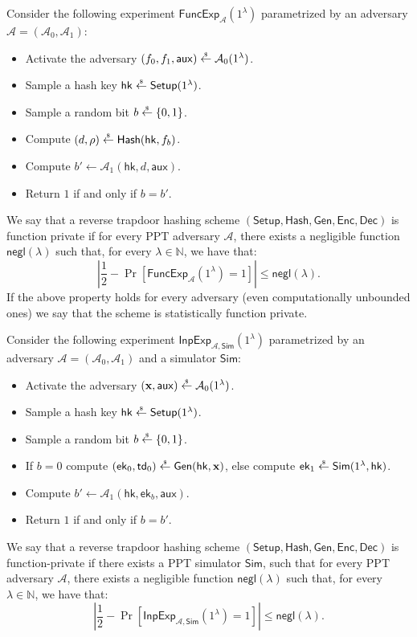 \documentclass{theoretics}
\newcommand{\ek}{\mathsf{ek}}
\newcommand{\td}{\mathsf{td}}
\newcommand{\getsr}{\overset{\raisebox{-1pt}{$\scriptscriptstyle \$$}}{\gets}}
\newcommand{\sample}{\getsr}
\newcommand{\N}{\mathbb{N}}
\newcommand{\negl}{\mathsf{negl}}
\renewcommand{\sec}{\ensuremath{\lambda}}
\newcommand{\aux}{\mathsf{aux}}
\newcommand{\Sim}{\mathsf{Sim}}
\newcommand{\Adv}{\mathcal{A}}
\newcommand{\algofont}[1]{\ensuremath{\mathsf{#1}}}
\newcommand{\Enc}{{\algofont{Enc}}}
\newcommand{\Dec}{{\algofont{Dec}}}
\newcommand{\Setup}{{\algofont{Setup}}}
\newcommand{\Gen}{{\algofont{Gen}}}
\newcommand{\Hash}{{\algofont{Hash}}}
\newcommand{\hk}{\ensuremath{\mathsf{hk}}}
\newcommand\bbbone{1}
\begin{document}
\begin{definition}\leavevmode\par
Consider the following experiment $\mathsf{FuncExp}_{\mathcal{A}}(\bbbone^\sec)$ parametrized by an adversary $\mathcal{A} = (\mathcal{A}_0, \mathcal{A}_1)$:
\begin{itemize}
    \item Activate the adversary $(f_0, f_1, \aux)\sample\Adv_0(\bbbone^\sec)$.
    \item Sample a hash key $\hk\sample\Setup(\bbbone^\sec)$.
    \item Sample a random bit $b\sample\{0, 1\}$. 
    \item Compute $(d, \rho)\sample\Hash(\hk, f_b)$.
    \item Compute $b' \gets \Adv_1(\hk, d, \aux)$.
    \item Return $1$ if and only if $b =b'$.
\end{itemize}
We say that a reverse trapdoor hashing scheme $(\Setup, \Hash, \Gen, \Enc, \Dec)$ is function private if for every PPT adversary $\mathcal{A}$, there exists a negligible function $\negl(\sec)$ such that, for every $\sec\in\N$, we have that:
\[
\left|\frac{1}{2} - \Pr\left[\mathsf{FuncExp}_{\mathcal{A}}(\bbbone^\sec) = 1\right] \right|\le\negl(\sec).
\]
If the above property holds for every adversary (even computationally unbounded ones) we say that the scheme is statistically function private.
\end{definition}

\begin{definition}
Consider the following experiment $\mathsf{InpExp}_{\mathcal{A}, \Sim}(\bbbone^\sec)$ parametrized by an adversary $\mathcal{A} = (\mathcal{A}_0, \mathcal{A}_1)$ and a simulator $\Sim$:
\begin{itemize}
    \item Activate the adversary $(\mathbf{x}, \aux)\sample\Adv_0(\bbbone^\sec)$.
    \item Sample a hash key $\hk\sample\Setup(\bbbone^\sec)$.
    \item Sample a random bit $b\sample\{0, 1\}$. 
    \item If $b = 0$ compute $(\ek_0, \td_0)\sample\Gen(\hk, \mathbf{x})$, else compute 
    $\ek_1\sample\Sim(\bbbone^\sec, \hk)$.
    \item Compute $b' \gets \Adv_1(\hk, \ek_b, \aux)$.
    \item Return $1$ if and only if $b =b'$.
\end{itemize}
We say that a reverse trapdoor hashing scheme $(\Setup, \Hash, \Gen, \Enc, \Dec)$ is function-private if there exists a PPT simulator $\Sim$, such that for every PPT adversary $\mathcal{A}$, there exists a negligible function $\negl(\sec)$ such that, for every $\sec\in\N$, we have that:
\[
\left|\frac{1}{2} - \Pr\left[\mathsf{InpExp}_{\mathcal{A}, \Sim}(\bbbone^\sec) = 1\right] \right|\le\negl(\sec).
\]
\end{definition}
\end{document}
